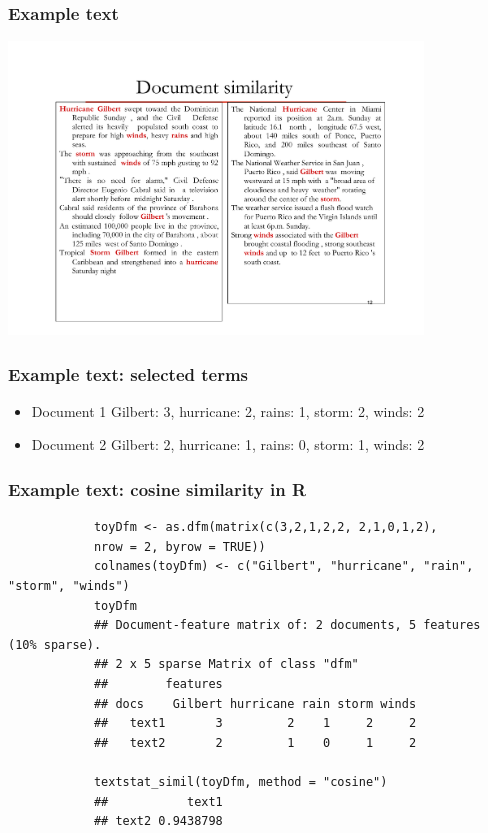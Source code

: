 \documentclass{beamer}
\begin{document}
\begin{frame}
	\frametitle{Example text}
	\begin{center}
		\includegraphics[width=11cm]{figures/gilbertdocs.pdf}
	\end{center}
\end{frame}

\begin{frame}
	\frametitle{Example text: selected terms}
	\begin{itemize}
		\item \alert{Document 1} \newline Gilbert: 3, hurricane: 2, rains: 1, storm: 2,
		winds: 2 \newline
		\item \alert{Document 2} \newline Gilbert: 2, hurricane: 1, rains: 0, storm: 1,
		winds: 2
	\end{itemize}
\end{frame}

\begin{frame}[fragile]
	\frametitle{Example text: cosine similarity in R}
	\begin{center}
		\begin{footnotesize}
			\begin{verbatim}
			toyDfm <- as.dfm(matrix(c(3,2,1,2,2, 2,1,0,1,2),
			nrow = 2, byrow = TRUE))
			colnames(toyDfm) <- c("Gilbert", "hurricane", "rain", "storm", "winds")
			toyDfm
			## Document-feature matrix of: 2 documents, 5 features (10% sparse).
			## 2 x 5 sparse Matrix of class "dfm"
			##        features
			## docs    Gilbert hurricane rain storm winds
			##   text1       3         2    1     2     2
			##   text2       2         1    0     1     2
			
			textstat_simil(toyDfm, method = "cosine")
			##           text1
			## text2 0.9438798
			\end{verbatim}
		\end{footnotesize}
	\end{center}
\end{frame}
\end{document}
